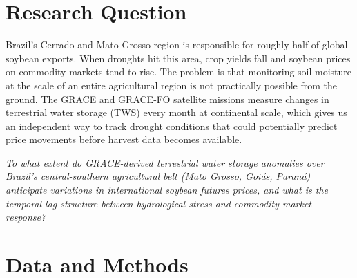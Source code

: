 \documentclass[10pt, twocolumn]{article}
\begin{document}

\section{Research Question}
\label{sec:rq}

Brazil's Cerrado and Mato Grosso region is responsible for roughly
half of global soybean exports. When droughts hit this area, crop
yields fall and soybean prices on commodity markets tend to rise.
The problem is that monitoring soil moisture at the scale of an
entire agricultural region is not practically possible from the
ground. The GRACE and GRACE-FO satellite missions \cite{tapley2004grace, landerer2020extending} measure changes
in terrestrial water storage (TWS) every month at continental scale,
which gives us an independent way to track drought conditions that
could potentially predict price movements before harvest data
becomes available.

\begin{tcolorbox}[boxstyle, title=Research Question]
  \textit{To what extent do GRACE-derived terrestrial water storage
  anomalies over Brazil's central-southern agricultural belt
  (Mato Grosso, Goiás, Paraná) anticipate variations in
  international soybean futures prices, and what is the temporal
  lag structure between hydrological stress and commodity market
  response?}
\end{tcolorbox}

\columnbreak
\section{Data and Methods}
\label{sec:data}
\end{document}
